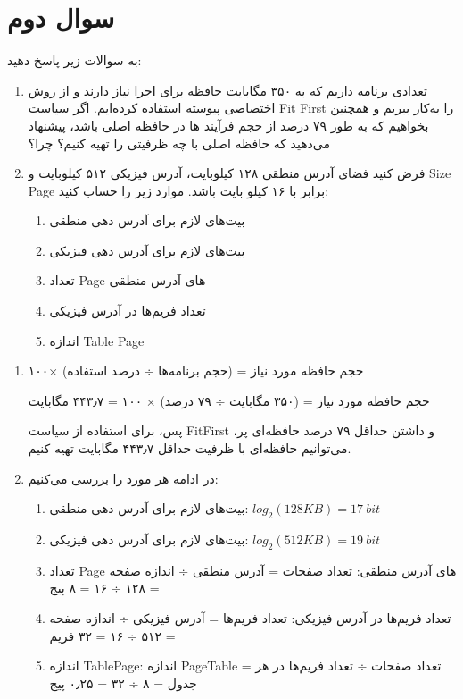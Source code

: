 \section{سوال دوم}

به سوالات زیر پاسخ دهید:

\begin{enumerate}
	\item تعدادی برنامه داریم که به ۳۵۰ مگابایت حافظه برای اجرا نیاز دارند و از روش اختصاصی پیوسته استفاده کرده‌ایم. اگر سیاست Fit First را به‌کار ببریم و همچنین بخواهیم که به طور ۷۹ درصد از حجم فرآیند ها در حافظه اصلی باشد، پیشنهاد می‌دهید که حافظه اصلی با چه ظرفیتی را تهیه کنیم؟ چرا؟
	
	\item فرض کنید فضای آدرس منطقی ۱۲۸ کیلو‌بایت، آدرس فیزیکی ۵۱۲ کیلوبایت و Size Page برابر با ۱۶ کیلو بایت باشد. موارد زیر را حساب کنید:
	
	\begin{enumerate}
		\item بیت‌های لازم برای آدرس دهی منطقی
		\item بیت‌های لازم برای آدرس دهی فیزیکی
		\item تعداد Page های آدرس منطقی
		\item تعداد فریم‌ها در آدرس فیزیکی
		\item اندازه Table Page
	\end{enumerate}
\end{enumerate}


\begin{qsolve}
	\begin{enumerate}
		\item حجم حافظه مورد نیاز = (حجم برنامه‌ها ÷ درصد استفاده)
			×۱۰۰ 
			
			حجم حافظه مورد نیاز = (۳۵۰ مگابایت ÷ ۷۹ درصد) × ۱۰۰ = ۴۴۳٫۷ مگابایت
			
پس، برای استفاده از سیاست FitFirst و داشتن حداقل ۷۹ درصد حافظه‌ای پر، می‌توانیم حافظه‌ای با ظرفیت حداقل ۴۴۳٫۷ مگابایت تهیه کنیم.
	
	\item در ادامه هر مورد را بررسی می‌کنیم:
	
	\begin{enumerate}
		\item بیت‌های لازم برای آدرس دهی منطقی:
		$log_2(128 KB) = 17 \ bit$
		
		\item بیت‌های لازم برای آدرس دهی فیزیکی:
		$log_2(512 KB) = 19 \ bit$
		
		\item تعداد Page های آدرس منطقی:
		تعداد صفحات = آدرس منطقی ÷ اندازه صفحه = ۱۲۸ ÷ ۱۶ = ۸ پیج
		
		\item تعداد فریم‌ها در آدرس فیزیکی:
		تعداد فریم‌ها = آدرس فیزیکی ÷ اندازه صفحه = ۵۱۲ ÷ ۱۶ = ۳۲ فریم
		
		\item اندازه TablePage:
		اندازه PageTable = تعداد صفحات ÷ تعداد فریم‌ها در هر جدول = ۸ ÷ ۳۲ = ۰٫۲۵ پیج
	\end{enumerate}
	
	
	\end{enumerate}
\end{qsolve}